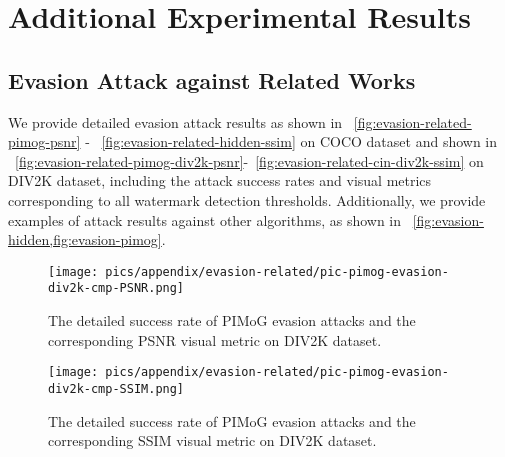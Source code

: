 \appendix
\onecolumn
\section{Additional Experimental Results}\label{sec:Appendix_Additional Experimental Results}
\subsection{Evasion Attack against Related Works}
\label{sec:appendix:Evasion Attack against Related Works}
We provide detailed evasion attack results as shown in ~\cref{fig:evasion-related-pimog-psnr} - ~\cref{fig:evasion-related-hidden-ssim} on COCO dataset and shown in ~\cref{fig:evasion-related-pimog-div2k-psnr}-~\cref{fig:evasion-related-cin-div2k-ssim} on DIV2K dataset, including the attack success rates and visual metrics corresponding to all watermark detection thresholds. Additionally, we provide examples of attack results against other algorithms, as shown in ~\cref{fig:evasion-hidden,fig:evasion-pimog}.

\begin{figure}[!t]
\begin{minipage}{0.48\linewidth}
    \centering
    \texttt{[image: pics/appendix/evasion-related/pic-pimog-evasion-div2k-cmp-PSNR.png]} 
    \vspace{-6mm}
    \caption{The detailed success rate of PIMoG evasion attacks and the corresponding PSNR visual metric on DIV2K dataset.}
    \label{fig:evasion-related-pimog-div2k-psnr}
\end{minipage}\hfill
\begin{minipage}{0.48\linewidth}
    \centering
    \texttt{[image: pics/appendix/evasion-related/pic-pimog-evasion-div2k-cmp-SSIM.png]}
    \vspace{-3mm}
    \caption{The detailed success rate of PIMoG evasion attacks and the corresponding SSIM visual metric on DIV2K dataset.}
    \label{fig:evasion-related-pimog-div2k-ssim}
\end{minipage}
\end{figure}

